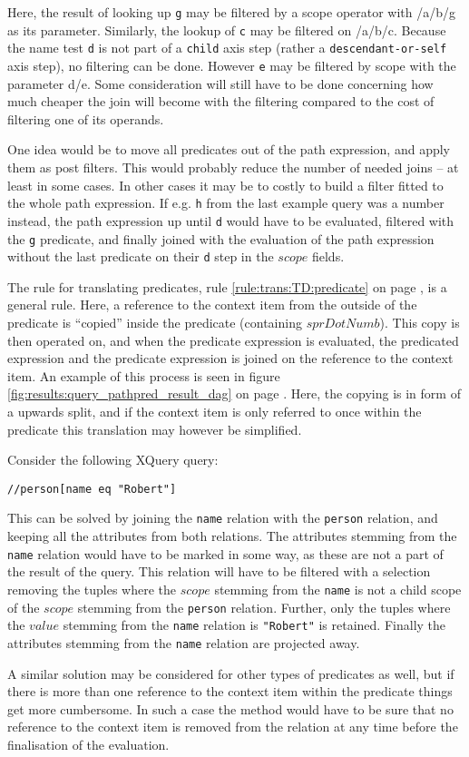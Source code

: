 Here, the result of looking up \texttt{g} may be filtered by a \textsf{scope} operator with \textsf{/a/b/g} as its
parameter. Similarly, the lookup of \texttt{c} may be filtered on \textsf{/a/b/c}. Because the name test \texttt{d}
is not part of a \texttt{child} axis step (rather a \texttt{descendant-or-self} axis step), no filtering can be
done. However \texttt{e} may be filtered by \textsf{scope} with the parameter
\textsf{d/e}. Some consideration will still have to be done concerning how much cheaper the join will become with the filtering compared to the cost
of filtering one of its operands.

One idea would be to move all predicates out of the path expression, and apply them as post filters. This would
probably reduce the number of needed joins -- at least in some cases. In other cases it may be to costly to build
a filter fitted to the whole path expression. If e.g. \texttt{h} from the last example query was a number instead,
the path expression up until \texttt{d} would have to be evaluated, filtered with the \texttt{g} predicate, and
finally joined with the evaluation of the path expression without the last predicate on their \texttt{d} step in
the $scope$ fields.

The rule for translating predicates, rule \ref{rule:trans:TD:predicate} on page \pageref{rule:trans:TD:predicate},
is a general rule. Here, a reference to the context item from the outside of the predicate is ``copied'' inside the
predicate (containing $sprDotNumb$). This copy is then operated on, and when the predicate expression is
evaluated, the predicated expression and the predicate expression is joined on the reference to the context item.
An example of this process is seen in figure \ref{fig:results:query_pathpred_result_dag} on page
\pageref{fig:results:query_pathpred_result_dag}. Here, the copying is in form
of a upwards split, and if the context item is only referred to once within the
predicate this translation may however be simplified.

Consider the following XQuery query:
\begin{center}
\texttt{//person[name eq "Robert"]}
\end{center}

This can be solved by joining the \texttt{name} relation with the \texttt{person} relation, and keeping all the
attributes from both relations. The attributes stemming from the \texttt{name} relation would have to be marked in
some way, as these are not a part of the result of the query. This relation will have to be filtered with a
selection removing the tuples where the $scope$ stemming from the \texttt{name} is not a child scope of the
$scope$ stemming from the \texttt{person} relation. Further, only the tuples where the $value$ stemming from the
\texttt{name} relation is \texttt{"Robert"} is retained. Finally the attributes stemming from the \texttt{name}
relation are projected away.

A similar solution may be considered for other types of predicates as well, but if there is more than one
reference to the context item within the predicate things get more cumbersome. In such a case the method would
have to be sure that no reference to the context item is removed from the relation at any time before the
finalisation of the evaluation.